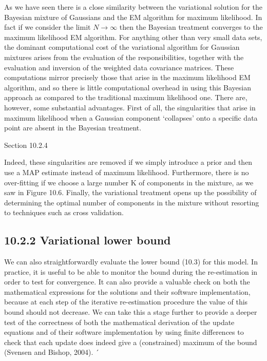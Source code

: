 \documentclass[
  10
]{article}
\begin{document}
As we have seen there is a close similarity between the variational
solution for the Bayesian mixture of Gaussians and the EM algorithm for
maximum likelihood. In fact if we consider the limit \(N \to \infty\)
then the Bayesian treatment converges to the maximum likelihood EM
algorithm. For anything other than very small data sets, the dominant
computational cost of the variational algorithm for Gaussian mixtures
arises from the evaluation of the responsibilities, together with the
evaluation and inversion of the weighted data covariance matrices. These
computations mirror precisely those that arise in the maximum likelihood
EM algorithm, and so there is little computational overhead in using
this Bayesian approach as compared to the traditional maximum likelihood
one. There are, however, some substantial advantages. First of all, the
singularities that arise in maximum likelihood when a Gaussian component
`collapses' onto a specific data point are absent in the Bayesian
treatment.

Section 10.2.4

Indeed, these singularities are removed if we simply introduce a prior
and then use a MAP estimate instead of maximum likelihood. Furthermore,
there is no over-fitting if we choose a large number K of components in
the mixture, as we saw in Figure 10.6. Finally, the variational
treatment opens up the possibility of determining the optimal number of
components in the mixture without resorting to techniques such as cross
validation.

\subsection{10.2.2 Variational lower
bound}\label{variational-lower-bound}

We can also straightforwardly evaluate the lower bound (10.3) for this
model. In practice, it is useful to be able to monitor the bound during
the re-estimation in order to test for convergence. It can also provide
a valuable check on both the mathematical expressions for the solutions
and their software implementation, because at each step of the iterative
re-estimation procedure the value of this bound should not decrease. We
can take this a stage further to provide a deeper test of the
correctness of both the mathematical derivation of the update equations
and of their software implementation by using finite differences to
check that each update does indeed give a (constrained) maximum of the
bound (Svensen and Bishop, 2004). ´
\end{document}
